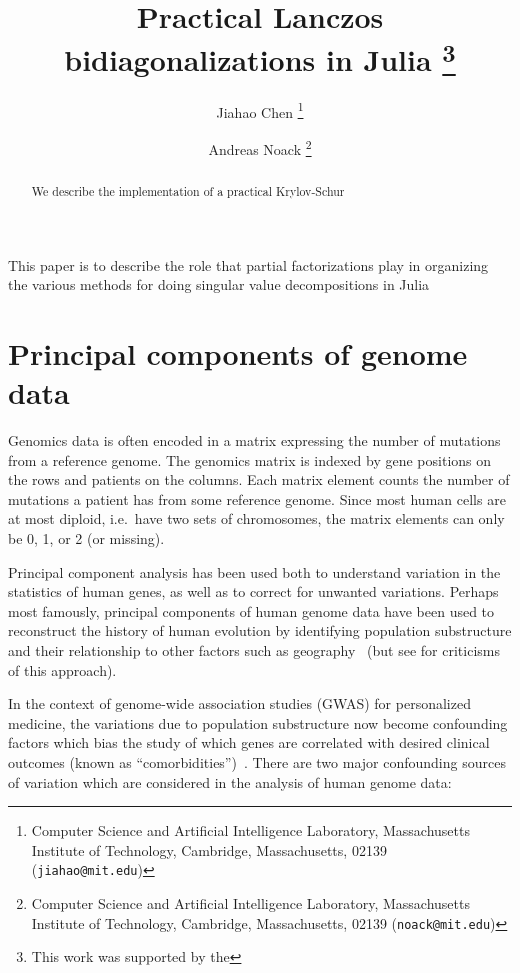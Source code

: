 \documentclass[final,leqno]{siamltex1213}
\title{Practical Lanczos bidiagonalizations in Julia
    \thanks{This
        work was supported by the
	}}
\author{%
    Jiahao Chen
    \thanks{Computer Science and Artificial Intelligence Laboratory,
           Massachusetts Institute of Technology,
           Cambridge, Massachusetts, 02139 ({\tt jiahao@mit.edu})}
    \and
    Andreas Noack
    \thanks{Computer Science and Artificial Intelligence Laboratory,
            Massachusetts Institute of Technology,
            Cambridge, Massachusetts, 02139 ({\tt noack@mit.edu})}
}
\begin{document}
\maketitle

\begin{abstract}
We describe the implementation of a practical Krylov-Schur
\end{abstract}

\begin{keywords}
\end{keywords}

\begin{AMS}
\end{AMS}

\pagestyle{myheadings}
\thispagestyle{plain}

\listoftodos

This paper is to describe the role that partial factorizations play in
organizing the various methods for doing singular value decompositions in
Julia


\section{Principal components of genome data}

Genomics data is often encoded in a matrix expressing the number of mutations
from a reference genome.
The genomics matrix is indexed by gene positions on the rows and patients on the
columns. Each matrix element counts the number of mutations a patient has from
some reference genome. Since most human cells are at most diploid, i.e.\ have
two sets of chromosomes,
the matrix elements can only be 0, 1, or 2 (or missing).

Principal component analysis has been used both to understand variation in
the statistics of human genes, as well as to correct for unwanted variations.
Perhaps most famously, principal components of human genome data have been used
to reconstruct the history of human evolution by identifying population
substructure and their relationship to other factors such as geography~\cite{Menozzi1978,Cavalli1994}
(but see \cite{Novembre2008} for criticisms of this approach).

In the context of genome-wide association studies (GWAS) for personalized
medicine, the variations due to population substructure now become confounding
factors which bias the study of which genes are correlated with desired clinical
outcomes (known as ``comorbidities'')~\cite[Ch. 8]{Laird2011}.
There are two major confounding sources of variation which are considered in
the analysis of human genome data:
\end{document}
